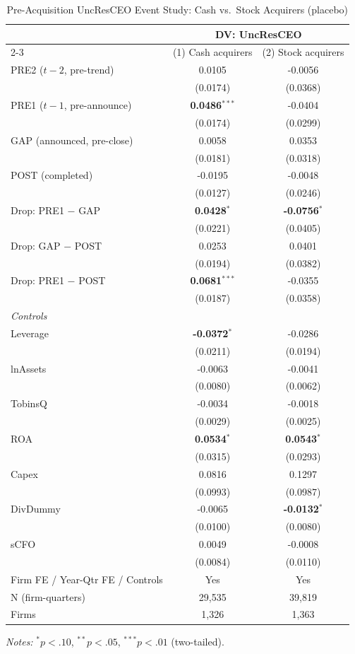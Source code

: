 \begin{table}[htbp]
\centering
\caption{Pre-Acquisition UncResCEO Event Study: Cash vs.\ Stock Acquirers (placebo)}
\label{tab:empire_drop_placebo}
\scriptsize
\begin{tabular}{lcc}
\toprule
 & \multicolumn{2}{c}{DV: UncResCEO} \\
\cmidrule(lr){2-3}
 & (1) Cash acquirers & (2) Stock acquirers \\
\midrule
PRE2 ($t{-}2$, pre-trend) & 0.0105 & -0.0056 \\
 & (0.0174) & (0.0368) \\
PRE1 ($t{-}1$, pre-announce) & \textbf{0.0486}$^{***}$ & -0.0404 \\
 & (0.0174) & (0.0299) \\
GAP (announced, pre-close) & 0.0058 & 0.0353 \\
 & (0.0181) & (0.0318) \\
POST (completed) & -0.0195 & -0.0048 \\
 & (0.0127) & (0.0246) \\
\midrule
Drop: PRE1 $-$ GAP & \textbf{0.0428}$^{*}$ & \textbf{-0.0756}$^{*}$ \\
 & (0.0221) & (0.0405) \\
Drop: GAP $-$ POST & 0.0253 & 0.0401 \\
 & (0.0194) & (0.0382) \\
Drop: PRE1 $-$ POST & \textbf{0.0681}$^{***}$ & -0.0355 \\
 & (0.0187) & (0.0358) \\
\midrule
\multicolumn{3}{l}{\textit{Controls}} \\
Leverage & \textbf{-0.0372}$^{*}$ & -0.0286 \\
 & (0.0211) & (0.0194) \\
lnAssets & -0.0063 & -0.0041 \\
 & (0.0080) & (0.0062) \\
TobinsQ & -0.0034 & -0.0018 \\
 & (0.0029) & (0.0025) \\
ROA & \textbf{0.0534}$^{*}$ & \textbf{0.0543}$^{*}$ \\
 & (0.0315) & (0.0293) \\
Capex & 0.0816 & 0.1297 \\
 & (0.0993) & (0.0987) \\
DivDummy & -0.0065 & \textbf{-0.0132}$^{*}$ \\
 & (0.0100) & (0.0080) \\
sCFO & 0.0049 & -0.0008 \\
 & (0.0084) & (0.0110) \\
\midrule
Firm FE / Year-Qtr FE / Controls & Yes & Yes \\
N (firm-quarters) & 29,535 & 39,819 \\
Firms & 1,326 & 1,363 \\
\bottomrule
\end{tabular}
\begin{minipage}{\linewidth}\vspace{2pt}\scriptsize
\textit{Notes:} $^{*}p<.10$, $^{**}p<.05$, $^{***}p<.01$ (two-tailed).
\end{minipage}
\end{table}